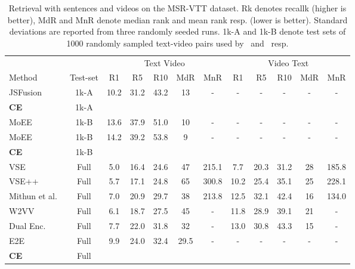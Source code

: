 \documentclass{bmvc2k}
\begin{document}
\begin{table}[t]
\centering 
\hspace{-0.2cm}
\footnotesize 
\setlength{\tabcolsep}{2pt}
\begin{tabular}{l | c |@{\hskip -0.25cm}c@{\hskip -0.35cm}c@{\hskip -0.35cm}c@{\hskip -0.1cm}c@{\hskip -0.2cm}c |@{\hskip -0.2cm}c@{\hskip -0.35cm}c@{\hskip -0.35cm}c@{\hskip -0.1cm}c@{\hskip -0.25cm}c} 
\hline \hline
\multicolumn{2}{c}{} & 
\multicolumn{5}{c}{Text  Video} & \multicolumn{5}{c}{Video  Text} \\
Method & Test-set & R1 & R5 & R10 & MdR & MnR & R1 & R5 & R10 & MdR & MnR \\ 
\hline 
JSFusion~\cite{yu2018joint} & 1k-A & 10.2 & 31.2 & 43.2 & 13 & - & - & - & - & - & - \\
\textbf{CE} & 1k-A &  &  & 	&   &  & 	& 	& & 	& \\
\hline 
MoEE~\cite{miech2018learning}& 1k-B & 13.6  &  37.9  &  51.0  &  10 & - & - & - & - & - & - \\
MoEE~\cite{miech2018learning}& 1k-B & 14.2  &  39.2  &  53.8  &  9 & - & - & - & - & - & - \\
\textbf{CE} & 1k-B & 	& 	&  & 	&    & 	& 	& & 	&  \\
\hline 
VSE \cite{mithun2018learning} & Full & 5.0 & 16.4 & 24.6 & 47 & 215.1 & 7.7 & 20.3 & 31.2 & 28 & 185.8\\
VSE++ \cite{mithun2018learning} & Full & 5.7 & 17.1 & 24.8 & 65 & 300.8 & 10.2 & 25.4 & 35.1 & 25 & 228.1 \\
Mithun et al.~\cite{mithun2018learning} & Full &  7.0 & 20.9 & 29.7 & 38 & 213.8  & 12.5 & 32.1 & 42.4 & 16 & 134.0 \\
W2VV~\cite{dong2018predicting} & Full & 6.1 & 18.7 & 27.5 & 45 & - &  11.8 & 28.9 & 39.1 & 21 & -  \\  
Dual Enc.~\cite{dong2018dual} & Full & 7.7 & 22.0 & 31.8 & 32 & - &  13.0 & 30.8 & 43.3 & 15 & - \\
E2E ~\cite{miech2019end} & Full & 9.9 & 24.0 &  32.4 &  29.5 & - & - & - & - & -  & - \\
\textbf{CE} & Full & 	& 	& 	& 	&  	& 	& 	& 	&  &  \\
\hline \hline
\end{tabular}
\vspace{0.2cm}
\caption{Retrieval with sentences and videos on the MSR-VTT dataset. Rk denotes recallk (higher is better), MdR and MnR denote median rank and mean rank resp. (lower is better). Standard deviations are reported from three randomly seeded runs. 1k-A and 1k-B denote test sets of 1000 randomly sampled text-video pairs used by~\cite{yu2018joint} and~\cite{miech2018learning} resp.}
\label{table:MSRVTT} 
\end{table}
\end{document}
